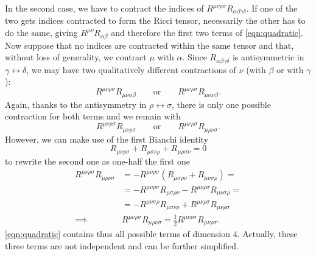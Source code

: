 \documentclass[a4paper,12pt]{book}
\theoremstyle{definition}
\theoremstyle{remark}
\begin{document}
In the second case, we have to contract the indices of $R^{\mu\nu\rho\sigma}R_{\alpha\beta\gamma\delta}$. If one of the two gets indices contracted to form the Ricci tensor, necessarily the other has to do the same, giving $R^{\mu\nu}R_{\alpha\beta}$ and therefore the first two terms of \cref{eqn:quadratic}. Now suppose that no indices are contracted within the same tensor and that, without loss of generality, we contract $\mu$ with $\alpha$. Since $R_{\alpha\beta\gamma\delta}$ is antisymmetric in $\gamma\leftrightarrow\delta$, we may have two qualitatively different contractions of $\nu$ (with $\beta$ or with $\gamma$):
\[R^{\mu\nu\rho\sigma}R_{\mu\nu\alpha\beta}\qquad\text{or}\qquad R^{\mu\nu\rho\sigma}R_{\mu\alpha\nu\beta}.\]
Again, thanks to the antisymmetry in $\rho\leftrightarrow\sigma$, there is only one possible contraction for both terms and we remain with
\[R^{\mu\nu\rho\sigma}R_{\mu\nu\rho\sigma}\qquad\text{or}\qquad R^{\mu\nu\rho\sigma}R_{\mu\rho\nu\sigma}.\]
However, we can make use of the first Bianchi identity
\[R_{\mu\nu\rho\sigma}+R_{\mu\sigma\nu\rho}+R_{\mu\rho\sigma\nu}=0\]
to rewrite the second one as one-half the first one
\begin{align*}
R^{\mu\nu\rho\sigma}R_{\mu\rho\nu\sigma}&=-R^{\mu\nu\rho\sigma}(R_{\mu\sigma\rho\nu}+R_{\mu\nu\sigma\rho})=\\
&=-R^{\mu\nu\rho\sigma}R_{\mu\sigma\rho\nu}-R^{\mu\nu\rho\sigma}R_{\mu\nu\sigma\rho}=\\
&=-R^{\mu\nu\sigma\rho}R_{\mu\sigma\nu\rho}+R^{\mu\nu\rho\sigma}R_{\mu\nu\rho\sigma}\\
\implies &R^{\mu\nu\rho\sigma}R_{\mu\rho\nu\sigma}=\frac12R^{\mu\nu\rho\sigma}R_{\mu\nu\rho\sigma}.
\end{align*}
\cref{eqn:quadratic} contains thus all possible terms of dimension 4. Actually, these three terms are not independent and can be further simplified.
\end{document}
